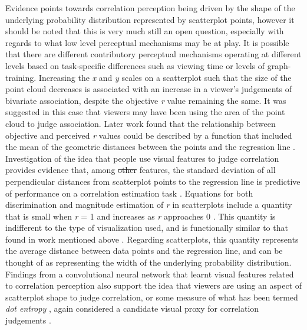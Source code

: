 \documentclass[manuscript, review, anonymous, screen]{acmart}
\providecommand{\DIFaddtex}[1]{{\protect\color{blue}\uwave{#1}}} %
\providecommand{\DIFdeltex}[1]{{\protect\color{red}\sout{#1}}}                      %
\providecommand{\DIFaddbegin}{} %
\providecommand{\DIFaddend}{} %
\providecommand{\DIFdelbegin}{} %
\providecommand{\DIFdelend}{} %
\providecommand{\DIFadd}[1]{\texorpdfstring{\DIFaddtex{#1}}{#1}} %
\providecommand{\DIFdel}[1]{\texorpdfstring{\DIFdeltex{#1}}{}} %
\newcommand{\DIFscaledelfig}{0.5}
\newlength{\DIFdelgraphicswidth} %
\newlength{\DIFdelgraphicsheight} %
\newcommand{\DIFaddincludegraphics}[2][]{{\color{blue}\fbox{\DIFOincludegraphics[#1]{#2}}}} %
\newcommand{\DIFdelincludegraphics}[2][]{%
\sbox{\DIFdelgraphicsbox}{\DIFOincludegraphics[#1]{#2}}%
\settoboxwidth{\DIFdelgraphicswidth}{\DIFdelgraphicsbox} %
\settoboxtotalheight{\DIFdelgraphicsheight}{\DIFdelgraphicsbox} %
\scalebox{\DIFscaledelfig}{%
\parbox[b]{\DIFdelgraphicswidth}{\usebox{\DIFdelgraphicsbox}\\[-\baselineskip] \rule{\DIFdelgraphicswidth}{0em}}\llap{\resizebox{\DIFdelgraphicswidth}{\DIFdelgraphicsheight}{%
\setlength{\unitlength}{\DIFdelgraphicswidth}%
\begin{picture}(1,1)%
\thicklines\linethickness{2pt} %
{\color[rgb]{1,0,0}\put(0,0){\framebox(1,1){}}}%
{\color[rgb]{1,0,0}\put(0,0){\line( 1,1){1}}}%
{\color[rgb]{1,0,0}\put(0,1){\line(1,-1){1}}}%
\end{picture}%
}\hspace*{3pt}}} %
} %
\DeclareRobustCommand{\DIFaddbegin}{\DIFOaddbegin \let\includegraphics\DIFaddincludegraphics} %
\DeclareRobustCommand{\DIFaddend}{\DIFOaddend \let\includegraphics\DIFOincludegraphics} %
\DeclareRobustCommand{\DIFdelbegin}{\DIFOdelbegin \let\includegraphics\DIFdelincludegraphics} %
\DeclareRobustCommand{\DIFdelend}{\DIFOaddend \let\includegraphics\DIFOincludegraphics} %
\begin{document}
Evidence points towards correlation perception being driven by the shape
of the underlying probability distribution represented by scatterplot
points, however it should be noted that this is very much still an open
question, especially with regards to what low level perceptual
mechanisms may be at play. It is possible that there are different
contributory perceptual mechanisms operating at different levels based
on task-specific differences such as viewing time or levels of
graph-training. Increasing the \emph{x} and \emph{y} scales on a
scatterplot such that the size of the point cloud decreases
\citep{cleveland_1982} is associated with an increase in a viewer's
judgements of bivariate association, despite the objective \emph{r}
value remaining the same. It was suggested in this case that viewers may
have been using the area of the point cloud to judge association. Later
work found that the relationship between objective and perceived
\emph{r} values could be described by a function that included the mean
of the geometric distances between the points and the regression line
\citep{meyer_1997}. Investigation of the idea that people use visual
features to judge correlation provides evidence that, among \DIFdelbegin \DIFdel{other
}\DIFdelend \DIFaddbegin \DIFadd{three other
equally predictive }\DIFaddend features, the standard deviation of all perpendicular
distances from scatterplot points to the regression line is predictive
of performance on a correlation estimation task \citep{yang_2019}.
Equations for both discrimination and magnitude estimation of \emph{r}
in scatterplots include a quantity that is small when \emph{r} = 1 and
increases as \emph{r} approaches 0 \citep{rensink_2017}. This quantity
is indifferent to the type of visualization used, and is functionally
similar to that found in work mentioned above
\citep{cleveland_1982, meyer_1997, yang_2019}. Regarding scatterplots,
this quantity represents the average distance between data points and
the regression line, and can be thought of as representing the width of
the underlying probability distribution. Findings from a convolutional
neural network that learnt visual features related to correlation
perception also support the idea that viewers are using an aspect of
scatterplot shape to judge correlation, or some measure of what has been
termed \emph{dot entropy} \citep{yang_2023}, again considered a
candidate visual proxy for correlation judgements
\citep{rensink_2017, rensink_2022}.
\end{document}
